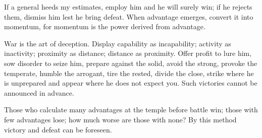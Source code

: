 \documentclass[12pt]{book}
\begin{document}
{If a general heeds my estimates, employ him and he will surely win; if he rejects them, dismiss him lest he bring defeat. When advantage emerges, convert it into momentum, for momentum is the power derived from advantage.

War is the art of deception. Display capability as incapability; activity as inactivity; proximity as distance; distance as proximity. Offer profit to lure him, sow disorder to seize him, prepare against the solid, avoid the strong, provoke the temperate, humble the arrogant, tire the rested, divide the close, strike where he is unprepared and appear where he does not expect you. Such victories cannot be announced in advance.

Those who calculate many advantages at the temple before battle win; those with few advantages lose; how much worse are those with none? By this method victory and defeat can be foreseen.}
\end{document}
